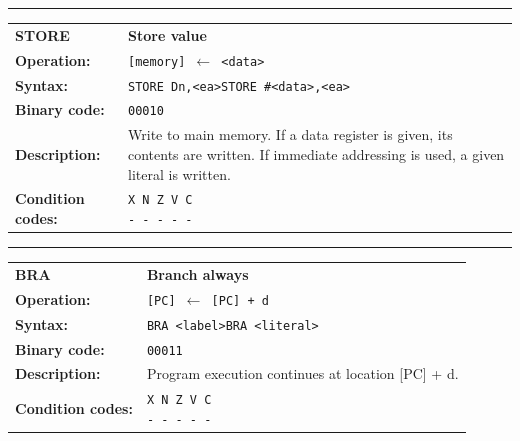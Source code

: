 \documentclass[]{article}
\begin{document}
\begin{appendices}
\noindent\rule{\textwidth}{1pt}\newline %
\setlength\extrarowheight{5pt} %
\begin{tabularx}{\textwidth}{lL}
  {\Large \textbf{STORE}} 	& {\Large \textbf{Store value}}\\
  \textbf{Operation:} 		& \texttt{[memory] $\leftarrow$ <data>}\\
  \textbf{Syntax:}  		& \texttt{STORE Dn,<ea>}\newline\texttt{STORE \#<data>,<ea>}\\
    \textbf{Binary code:} 	& \texttt{00010}\\
  \textbf{Description:}  	& Write to main memory. If a data register is given, its contents are written. If immediate addressing is used, a given literal is written.\\
  \textbf{Condition codes:} & \texttt{X N Z V C\newline - - - - -}\\
\end{tabularx}
\newline

\newpage

\noindent\rule{\textwidth}{1pt}\newline %
\setlength\extrarowheight{5pt} %
\begin{tabularx}{\textwidth}{lL}
  {\Large \textbf{BRA}} 	& {\Large \textbf{Branch always}}\\
  \textbf{Operation:} 		& \texttt{[PC] $\leftarrow$ [PC] + d}\\
  \textbf{Syntax:}  		& \texttt{BRA <label>}\newline\texttt{BRA <literal>}\\
  \textbf{Binary code:} 	& \texttt{00011}\\
  \textbf{Description:}  	& Program execution continues at location [PC] + d.\\
  \textbf{Condition codes:} & \texttt{X N Z V C\newline - - - - -}\\
\end{tabularx}
\newline


\end{appendices}
\end{document}

